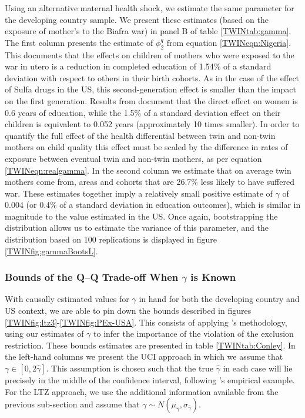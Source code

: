 \documentclass[subeqn]{article}
\begin{document}
\begin{spacing}{1.4}
Using an alternative maternal health shock, we estimate the same parameter
for the developing country sample.  We present these estimates (based on
the exposure of mother's to the Biafra war) in panel B of table
\ref{TWINtab:gamma}.  The first column presents the estimate of $\phi^q_2$
from equation \ref{TWINeqn:Nigeria}.  This documents that the effects on
children of mothers who were exposed to the war in utero is a reduction in
completed education of 1.54\% of a standard deviation with respect to others
in their birth cohorts.  As in the case of the effect of Sulfa drugs in the
US, this second-generation effect is smaller than the impact on the first
generation.  Results from \citet{Akreshetal2012} document that the direct
effect on women is 0.6 years of education, while the 1.5\% of a standard
deviation effect on their children is equivalent to 0.052 years
(approximately 10 times smaller).  In order to quantify the full effect of
the health differential between twin and non-twin mothers on child quality
this effect must be scaled by the difference in rates of exposure between
eventual twin and non-twin mothers, as per equation \ref{TWINeqn:realgamma}.
In the second column we estimate that on average twin mothers come from,
areas and cohorts that are 26.7\% less likely to have suffered war.  These
estimates together imply a relatively small positive estimate of $\gamma$
of 0.004 (or 0.4\% of a standard deviation in education outcomes), which
is similar in magnitude to the value estimated in the US.  Once again,
bootstrapping the distribution allows us to estimate the variance of this
parameter, and the distribution based on 100 replications is displayed in
figure \ref{TWINfig:gammaBootsL}.

\subsubsection{Bounds of the Q--Q Trade-off When $\gamma$ is Known}
With causally estimated values for $\gamma$ in hand for both the
developing country and US context, we are able to pin down the bounds
described in figures \ref{TWINfig:ltz3}-\ref{TWINfig:PEx-USA}.  This
consists of applying \citet{Conleyetal2012}'s methodology, using our
estimates of $\gamma$ to infer the importance of the violation of the
exclusion restriction.  These bounds estimates are presented in table
\ref{TWINtab:Conley}.  In the left-hand columns we present the UCI
approach in which we assume that $\gamma \in [0,2\hat\gamma]$.  This
assumption is chosen such that the true $\hat\gamma$ in each case will
lie precisely in the middle of the confidence interval, following
\citet{Conleyetal2012}'s empirical example.  For the LTZ approach, we
use the additional information available from the previous sub-section
and assume that $\gamma\sim N(\mu_{\hat\gamma},\sigma_{\hat\gamma})$.


\end{spacing}
\end{document}
